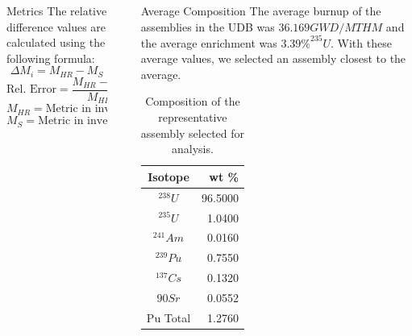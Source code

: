 \documentclass[final]{beamer}
\newlength{\sepwid}
\newlength{\onecolwid}
\newlength{\threecolwid}
\begin{document}
\begin{frame}[t]
\begin{columns}[t,totalwidth=\threecolwid]
\begin{column}{\onecolwid}
\begin{block}{Metrics}
The relative difference values are calculated using the following formula:
\[\Delta M_i = M_{HR} - M_{S} \]
\[\text{Rel. Error} = \frac{M_{HR} - M_{s}}{M_{HR}}\]
\[M_{HR} = \text{Metric in inventory (high-resolution case)}\]
\[M_{S} = \text{Metric in inventory (simplified case)}\]

\end{block}


\end{column} %

\begin{column}{\sepwid}\end{column} %



\begin{column}{\onecolwid} %






\begin{block}{Average Composition}
The average burnup of the assemblies in the \gls{UDB} was $36.169 GWD/MTHM$
and the average enrichment was $3.39 \% ^{235}U$. With these
average values, we selected an assembly closest to the
average. 
\begin{table}[h]
    \centering
    \begin{tabular}{cr}
        \hline
        Isotope & wt \% \\
        \hline
        $^{238}U$ & 96.5000 \\
        $^{235}U$ & 1.0400 \\
        $^{241}Am$ & 0.0160 \\
        $^{239}Pu$ & 0.7550   \\
        $^{137}Cs$ & 0.1320   \\
        ${90}Sr$ & 0.0552  \\
        Pu Total & 1.2760   \\
        \hline
    \end{tabular}
    \caption{Composition of the representative
             assembly selected for analysis.}
    \label{tab:avg}
\end{table}


\end{block}
\end{column}
\end{columns}
\end{frame}
\end{document}

